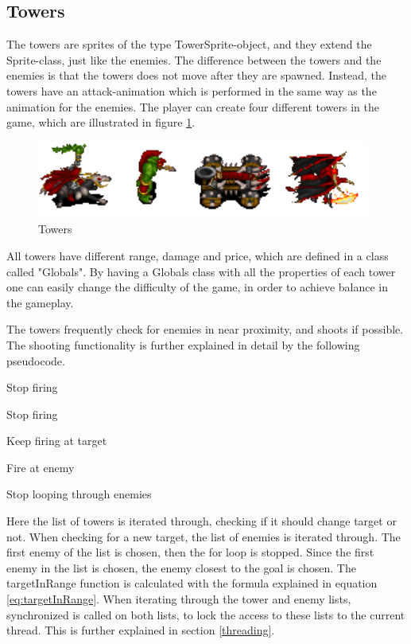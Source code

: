 \subsection{Towers}
The towers are sprites of the type TowerSprite-object, and they extend the Sprite-class, just like the enemies. The difference between the towers and the enemies is that the towers does not move after they are spawned. Instead, the towers have an attack-animation which is performed in the same way as the animation for the enemies. The player can create four different towers in the game, which are illustrated in figure \ref{fig:towers}. 

\begin{figure}[htbp]
	\centering
		\includegraphics{main/figures/towers}
	\caption{Towers}
	\label{fig:towers}
\end{figure}


All towers have different range, damage and price, which are defined in a class called "Globals". By having a Globals class with all the properties of each tower one can easily change the difficulty of the game, in order to achieve balance in the gameplay.


The towers frequently check for enemies in near proximity, and shoots if possible. The shooting functionality is further explained in detail by the following pseudocode.\newline


\begin{algorithmic}
			\item Stop firing
			\item Stop firing
		\ELSE
			\item Keep firing at target
		\ENDIF
	\ELSE
				\item Fire at enemy
				\item Stop looping through enemies
			\ENDIF
		\ENDFOR
	\ENDIF
\ENDFOR
\end{algorithmic}

Here the list of towers is iterated through, checking if it should change target or not. When checking for a new target, the list of enemies is iterated through. The first enemy of the list is chosen, then the for loop is stopped. Since the first enemy in the list is chosen, the enemy closest to the goal is chosen. The targetInRange function is calculated with the formula explained in equation \ref{eq:targetInRange}. When iterating through the tower and enemy lists, synchronized is called on both lists, to lock the access to these lists to the current thread. This is further explained in section \ref{threading}.

